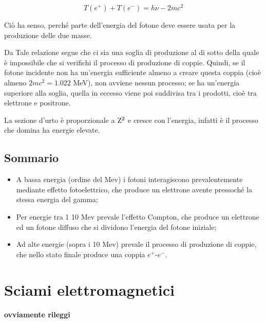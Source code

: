 $$T(e^+) + T(e^-)=h\nu - 2mc^2$$

Ciò ha senso, perché parte dell'energia del fotone deve essere usata per la produzione delle due masse.

Da Tale relazione segue che ci sia una soglia di produzione al di sotto della quale è impossibile che si verifichi il processo di produzione di coppie. Quindi, se il fotone incidente non ha un'energia sufficiente almeno a creare questa coppia (cioè almeno $2mc^2=1.022$ MeV), non avviene nessun processo; se ha un'energia superiore alla soglia, quella in eccesso viene poi suddivisa tra i prodotti, cioè tra elettrone e positrone.

La sezione d'urto è proporzionale a $\rm Z^2$ e cresce con l'energia, infatti è il processo che domina ha energie elevate.

\subsection{Sommario}

\begin{itemize}
    \item A bassa energia (ordine del Mev) i fotoni interagiscono prevalentemente mediante effetto fotoelettrico, che produce un elettrone avente pressoché la stessa energia del gamma;

    \item Per energie tra 1 10 Mev prevale l'effetto Compton, che produce un elettrone ed un fotone diffuso che si dividono l'energia del fotone iniziale;
    \item Ad alte energie (sopra i 10 Mev) prevale il processo di produzione di coppie, che nello stato finale produce una coppia $e^+$-$e^-$.
\end{itemize}


\section{Sciami elettromagnetici}

\textbf{ovviamente rileggi}

